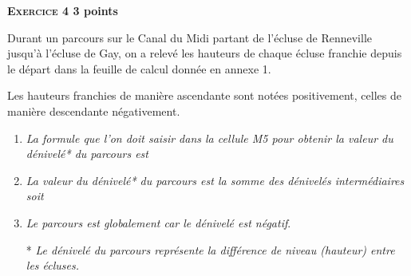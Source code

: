 \textbf{\textsc{Exercice 4} \hfill 3 points}

\medskip

Durant un parcours sur le Canal du Midi partant de l'écluse de Renneville jusqu'à l'écluse de Gay, on a relevé les hauteurs de chaque écluse franchie depuis le départ dans la feuille de calcul donnée en annexe 1.
 
Les hauteurs franchies de manière ascendante sont notées positivement, celles de manière descendante négativement.

\medskip
 
\begin{enumerate}
\item \textit{La formule que l'on doit saisir dans la cellule M5 pour obtenir la valeur du dénivelé* du parcours est} 
\item \textit{La valeur du dénivelé* du parcours est la somme des dénivelés intermédiaires soit}  
\item \textit{Le parcours est  globalement  car le dénivelé est négatif}.
 
* \emph{Le dénivelé du parcours représente la différence de niveau (hauteur) entre les écluses.}
\end{enumerate}
 
\vspace{0,5cm}

